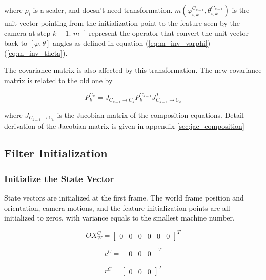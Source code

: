 \noindent where $\rho_i$ is a scaler, and doesn't need transformation.
$m(\varphi_{i, k}^{C_{k-1}}, \theta_{i, k}^{C_{k-1}})$ is the unit
vector pointing from the initialization point to the feature seen by
the camera at step $k-1$. $m^{-1}$ represent the operator that convert
the unit vector back to $[\varphi, \theta]$ angles as defined in
equation (\ref{eq:m_inv_varphi}) (\ref{eq:m_inv_theta}).

The covariance matrix is also affected by this transformation. The new
covariance matrix is related to the old one by

\begin{equation}
P_{k}^{C_{k}}=J_{C_{k-1}\to C_{k}}P_{k}^{C_{k-1}}J_{C_{k-1}\to C_{k}}^{T}
\end{equation}

\noindent where $J_{C_{k-1} \to C_k}$ is the Jacobian matrix of the
composition equations. Detail derivation of the Jacobian matrix is
given in appendix \ref{sec:jac_composition}  

\subsection{Filter Initialization}
\subsubsection{Initialize the State Vector}

State vectors are initialized at the first frame. The world frame
position and orientation, camera motions, and the feature
initialization points are all initialized to zeros, with variance
equals to the smallest machine number.

\begin{equation}
\label{eq:OX_init}
OX_{W}^{C}=\begin{bmatrix}0&0&0&0&0&0\end{bmatrix}^T 
\end{equation}

\begin{equation}
c^{C}=\begin{bmatrix}0&0&0\end{bmatrix}^T
\end{equation}

\begin{equation}
r^{C}=\begin{bmatrix}0&0&0\end{bmatrix}^T
\end{equation}

